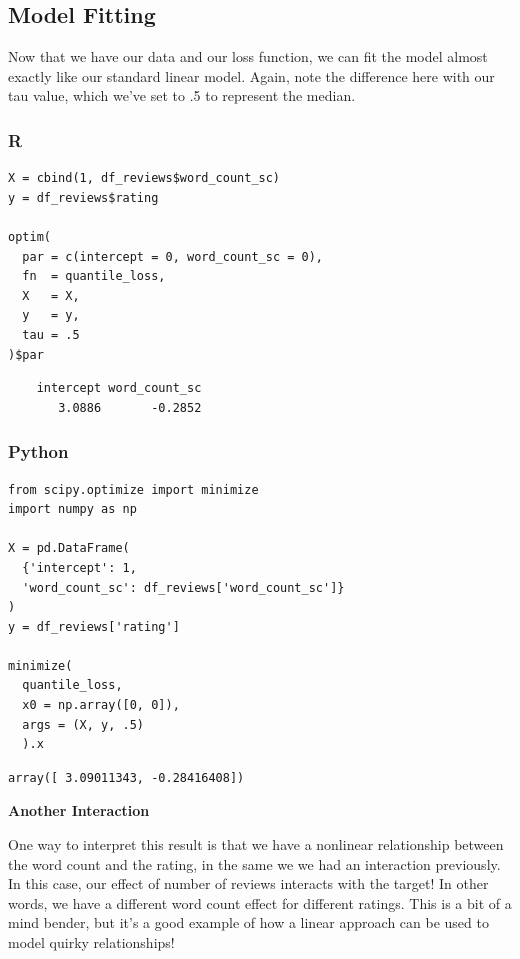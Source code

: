 \documentclass[
  letterpaper,
]{krantz}
\begin{document}
\subsection{Model Fitting}\label{sec-quantile-model}

Now that we have our data and our loss function, we can fit the model
almost exactly like our standard linear model. Again, note the
difference here with our tau value, which we've set to .5 to represent
the median.

\subsubsection{R}

\begin{verbatim}
X = cbind(1, df_reviews$word_count_sc)
y = df_reviews$rating

optim(
  par = c(intercept = 0, word_count_sc = 0),
  fn  = quantile_loss,
  X   = X,
  y   = y,
  tau = .5
)$par
\end{verbatim}

\begin{verbatim}
    intercept word_count_sc 
       3.0886       -0.2852 
\end{verbatim}

\subsubsection{Python}

\begin{verbatim}
from scipy.optimize import minimize
import numpy as np

X = pd.DataFrame(
  {'intercept': 1, 
  'word_count_sc': df_reviews['word_count_sc']}
)
y = df_reviews['rating']

minimize(
  quantile_loss, 
  x0 = np.array([0, 0]), 
  args = (X, y, .5)
  ).x
\end{verbatim}

\begin{verbatim}
array([ 3.09011343, -0.28416408])
\end{verbatim}

\begin{tcolorbox}[enhanced jigsaw, colframe=quarto-callout-tip-color-frame, opacityback=0, breakable, left=2mm, rightrule=.15mm, toprule=.15mm, arc=.35mm, leftrule=.75mm, colback=white, bottomrule=.15mm]

\vspace{-3mm}\textbf{Another Interaction}\vspace{3mm}

One way to interpret this result is that we have a nonlinear
relationship between the word count and the rating, in the same we we
had an interaction previously. In this case, our effect of number of
reviews interacts with the target! In other words, we have a different
word count effect for different ratings. This is a bit of a mind bender,
but it's a good example of how a linear approach can be used to model
quirky relationships!

\end{tcolorbox}
\end{document}
